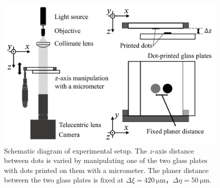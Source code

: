 \begin{figure}[H]
    \centering
    \includegraphics[width=0.8\linewidth]{./Figure/7_Appendix/expdiagram.pdf}
    \caption{Schematic diagram of experimental setup. The $z$-axis distance between dots is varied by manipulating one of the two glass plates with dots printed on them with a micrometer. The planer distance between the two glass plates is fixed at $\Delta \xi = \SI{420}{\um}$，$\Delta \eta = \SI{50}{\um}$.}
    \label{fig:appendixBsetup}
\end{figure}


